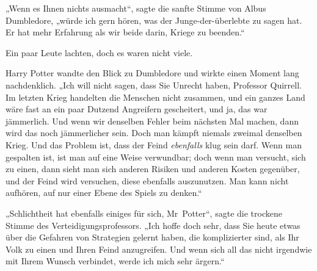 „Wenn es Ihnen nichts ausmacht“, sagte die sanfte Stimme von Albus Dumbledore, „würde ich gern hören, was der Junge-der-überlebte zu sagen hat. Er hat mehr Erfahrung als wir beide darin, Kriege zu beenden.“

Ein paar Leute lachten, doch es waren nicht viele.

Harry Potter wandte den Blick zu Dumbledore und wirkte einen Moment lang nachdenklich.
„Ich will nicht sagen, dass Sie Unrecht haben, Professor Quirrell. Im letzten Krieg handelten die Menschen nicht zusammen, und ein ganzes Land wäre fast an ein paar Dutzend Angreifern gescheitert, und ja, das war jämmerlich. Und wenn wir denselben Fehler beim nächsten Mal machen, dann wird das noch jämmerlicher sein. Doch man kämpft niemals zweimal denselben Krieg. Und das Problem ist, dass der Feind \emph{ebenfalls} klug sein darf. Wenn man gespalten ist, ist man auf eine Weise verwundbar; doch wenn man versucht, sich zu einen, dann sieht man sich anderen Risiken und anderen Kosten gegenüber, und der Feind wird versuchen, diese ebenfalls auszunutzen. Man kann nicht aufhören, auf nur einer Ebene des Spiels zu denken.“

„Schlichtheit hat ebenfalls einiges für sich, Mr~Potter“, sagte die trockene Stimme des Verteidigungsprofessors.
„Ich hoffe doch sehr, dass Sie heute etwas über die Gefahren von Strategien gelernt haben, die komplizierter sind, als Ihr Volk zu einen und Ihren Feind anzugreifen. Und wenn sich all das nicht irgendwie mit Ihrem Wunsch verbindet, werde ich mich sehr ärgern.“

